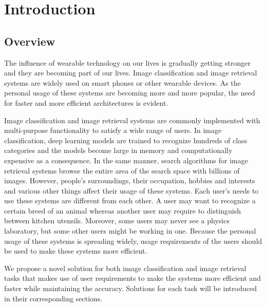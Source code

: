 
\lhead[\chaptername~\thechapter]{\rightmark}

\rhead[\leftmark]{}

\lfoot[\thepage]{}

\cfoot{}

\rfoot[]{\thepage}

\chapter{Introduction}
\label{introduction}

\section{Overview}

The influence of wearable technology on our lives is gradually getting stronger and they are becoming part of our lives. 
Image classification and image retrieval systems are widely used on smart phones or other wearable devices.
As the personal usage of these systems are becoming more and more popular, the need for faster and more efficient architectures is evident. 

Image classification and image retrieval systems are commonly implemented with multi-purpose functionality to satisfy a wide range of users. 
In image classification, deep learning models are trained to recognize hundreds of class categories and the models become large in memory and computationally expensive as a consequence.
In the same manner, search algorithms for image retrieval systems browse the entire area of the search space with billions of images.
However, people's surroundings, their occupation, hobbies and interests and various other things affect their usage of these systems.
Each user's needs to use these systems are different from each other.
A user may want to recognize a certain breed of an animal 
whereas another user may require to distinguish between kitchen utensils.
Moreover, some users may never see a physics laboratory, but some other users might be working in one.
Because the personal usage of these systems is spreading widely, 
usage requirements of the users should be used to make these systems more efficient.

We propose a novel solution for both image classification and image retrieval tasks 
that makes use of user requirements to make the systems more efficient and faster while maintaining the accuracy.
Solutions for each task will be introduced in their corresponding sections.



